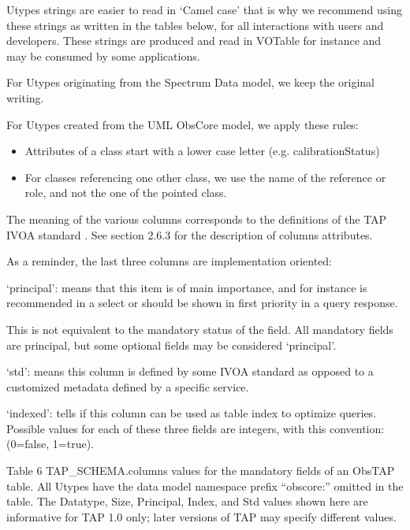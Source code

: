 \documentclass[11pt,a4paper]{ivoa}
\begin{document}
Utypes strings are easier to read in `Camel case' that is why we recommend using these strings as written in the tables
below, for all interactions with users and developers. These strings are produced and read in VOTable for instance and
may be consumed by some applications.

For Utypes originating from the Spectrum Data model, we keep the original writing.

For Utypes created from the UML ObsCore model, we apply these rules:

\begin{itemize}
\item Attributes of a class start with a lower case letter (e.g. calibrationStatus)
\item For classes referencing one other class, we use the name of the reference or role, and not the one of the pointed
class. 
\end{itemize}
The meaning of the various columns corresponds to the definitions of the TAP IVOA standard \citep{CITATIONTAPl1036}. See
section 2.6.3 for the description of columns attributes.

As a reminder, the last three columns are implementation oriented: 

{}`principal': means that this item is of main importance, and for instance is recommended in a select or should be
shown in first priority in a query response.

This is not equivalent to the mandatory status of the field. All mandatory fields are principal, but some optional
fields may be considered `principal'.

{}`std': means this column is defined by some IVOA standard as opposed to a customized metadata defined by a specific
service.

{}`indexed': tells if this column can be used as table index to optimize queries. Possible values for each of these
three fields are integers, with this convention: (0=false, 1=true).

Table  6  TAP\_SCHEMA.columns values for the mandatory fields of an ObsTAP table. All Utypes have the data model
namespace prefix {}``obscore:'' omitted in the table. The Datatype, Size, Principal, Index, and Std values shown here
are informative for TAP 1.0 only; later versions of TAP may specify different values.
\end{document}
